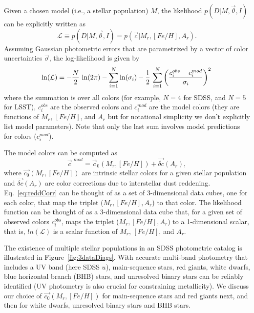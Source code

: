Given a chosen model (i.e., a stellar population) $M$, the likelihood $p(D|M,\vec{\theta},I)$ can be explicitly written as
\begin{equation}
        \mathcal{L} \equiv p(D|M,\vec{\theta},I) = p(\vec{c}|M_r, [Fe/H], A_r).
\end{equation}
Assuming Gaussian photometric errors that are parametrized by a vector of color uncertainties $\vec{\sigma}$,
the log-likelihood is given by
\begin{equation}
   \label{eq:lnLcolors}
   \ln (\mathcal{L}) =  - {N \over 2} \, \ln(2\pi) - \sum_{i=1}^N \ln(\sigma_i) - {1 \over 2} \,\sum_{i=1}^N \left({ c^{obs}_i - c^{mod}_i  \over \sigma_i } \right)^2 \,
\end{equation}
where the summation is over all colors (for example, $N=4$ for SDSS, and $N=5$ for LSST), \ensuremath{c^{obs}_i} are the
observed colors and \ensuremath{c^{mod}_i} are the model colors (they are functions of $M_r$, $[Fe/H]$, and $A_r$
but for notational simplicity we don't explicitly list model parameters). Note that only the last sum involves model predictions
for colors ($c^{mod}_i$).

The model colors can be computed as
\begin{equation}
  \label{eq:reddCorr} 
                       \vec{c}^{\,\,mod}  = \vec{c}_0(M_r, [Fe/H]) + \vec{\delta c}(A_r),
\end{equation}
where $\vec{c_0}(M_r, [Fe/H])$ are intrinsic stellar colors for a given stellar population and $\vec{\delta c}(A_r)$ are
color corrections due to interstellar dust reddening. Eq.~\ref{eq:reddCorr} can be thought of as a set of 
3-dimensional data cubes, one for each color, that map the triplet ($M_r, [Fe/H], A_r$) to that color. 
The likelihood function can be thought of as a  3-dimensional data cube that, for a given set of observed colors $c^{obs}_i$,
maps the triplet ($M_r, [Fe/H], A_r$) to a 1-dimensional scalar, that is, $ln (\mathcal{L})$ is a scalar function of
$M_r$, $[Fe/H]$, and $A_r$.
        
The existence of multiple stellar populations in an SDSS photometric catalog is illustrated in Figure~\ref{fig:3dataDiags}.
With accurate multi-band photometry that includes a UV band (here SDSS $u$), main-sequence stars, red giants,
white dwarfs, blue horizontal branch (BHB) stars, and unresolved binary stars can be reliably identified (UV photometry
is also crucial for constraining metallicity). We discuss our choice of $\vec{c_0}(M_r, [Fe/H])$ for main-sequence stars
and red giants next, and then for white dwarfs, unresolved binary stars and BHB stars. 

